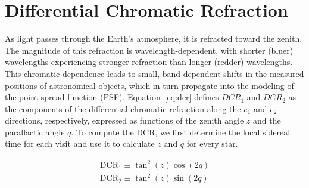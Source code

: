 \section{Differential Chromatic Refraction}
As light passes through the Earth’s atmosphere, it is refracted toward the zenith. 
The magnitude of this refraction is wavelength-dependent, with shorter (bluer) wavelengths 
experiencing stronger refraction than longer (redder) wavelengths. This chromatic dependence 
leads to small, band-dependent shifts in the measured positions of astronomical objects, 
which in turn propagate into the modeling of the point-spread function (PSF). 
Equation~\ref{eq:dcr} defines $DCR_1$ and $DCR_2$ as the components of the differential 
chromatic refraction along the $e_1$ and $e_2$ directions, respectively, expressed as 
functions of the zenith angle $z$ and the parallactic angle $q$. To compute the DCR, 
we first determine the local sidereal time for each visit and use it to calculate 
$z$ and $q$ for every star.

\begin{equation}
\label{eq:dcr}
    \begin{aligned}
        \mathrm{DCR_1} \equiv \tan^2(z)\cos(2q) \\
        \mathrm{DCR_2} \equiv \tan^2(z)\sin(2q)
    \end{aligned}
\end{equation}
